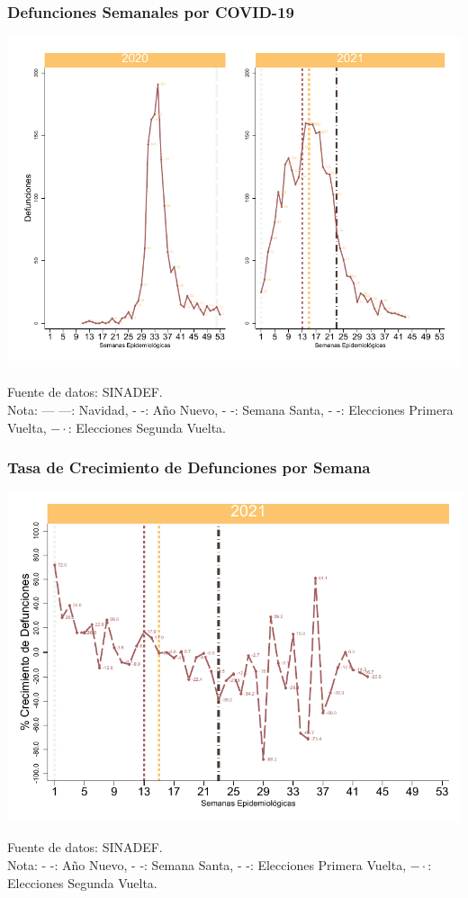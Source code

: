 \documentclass[xcolor=table]{beamer}
\begin{document}
	\begin{frame}
		\frametitle{Defunciones Semanales por COVID-19}
		\vspace{-.5cm}
		\begin{center}
			\includegraphics[width=0.9\linewidth, trim={0cm .5cm 0cm 0.2cm},clip]{../figuras/defunciones_20_21.pdf}
		\end{center}
		{\tiny Fuente de datos: SINADEF.\\
		Nota: {\color{mycolor1} --- ---: Navidad}, {\color{mycolor1} - -: Año Nuevo}, {\color{mycolor2} - -: Semana Santa}, {\color{mycolor3} - -: Elecciones Primera Vuelta}, {\color{mycolor4} $- \cdot$: Elecciones Segunda Vuelta}. \\}
	\end{frame}
	
	\begin{frame}
		\frametitle{Tasa de Crecimiento de Defunciones por Semana}
		\vspace{-.5cm}
		\begin{center}
			\includegraphics[width=0.9\linewidth]{../figuras/defunciones_crecimiento_2021.pdf}
		\end{center} 
		{\tiny Fuente de datos: SINADEF. \\
			Nota: {\color{mycolor1} - -: Año Nuevo}, {\color{mycolor2} - -: Semana Santa}, {\color{mycolor3} - -: Elecciones Primera Vuelta}, {\color{mycolor4} $- \cdot$: Elecciones Segunda Vuelta}. \\}
	\end{frame}
\end{document}
